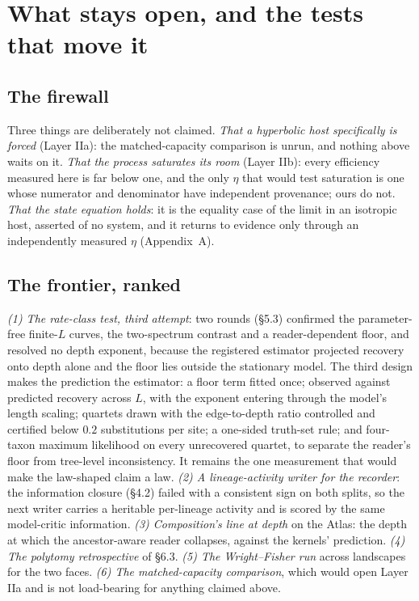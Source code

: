 \documentclass[11pt]{article}
\begin{document}
\section{What stays open, and the tests that move it}

\subsection{The firewall}
Three things are deliberately not claimed. \emph{That a hyperbolic host specifically is forced} (Layer IIa): the matched-capacity comparison is unrun, and nothing above waits on it. \emph{That the process saturates its room} (Layer IIb): every efficiency measured here is far below one, and the only $\eta$ that would test saturation is one whose numerator and denominator have independent provenance; ours do not. \emph{That the state equation holds}: it is the equality case of the limit in an isotropic host, asserted of no system, and it returns to evidence only through an independently measured $\eta$ (Appendix~A).

\subsection{The frontier, ranked}
\emph{(1) The rate-class test, third attempt}: two rounds (\S5.3) confirmed the parameter-free finite-$L$ curves, the two-spectrum contrast and a reader-dependent floor, and resolved no depth exponent, because the registered estimator projected recovery onto depth alone and the floor lies outside the stationary model. The third design makes the prediction the estimator: a floor term fitted once; observed against predicted recovery across $L$, with the exponent entering through the model's length scaling; quartets drawn with the edge-to-depth ratio controlled and certified below $0.2$ substitutions per site; a one-sided truth-set rule; and four-taxon maximum likelihood on every unrecovered quartet, to separate the reader's floor from tree-level inconsistency. It remains the one measurement that would make the law-shaped claim a law. \emph{(2) A lineage-activity writer for the recorder}: the information closure (\S4.2) failed with a consistent sign on both splits, so the next writer carries a heritable per-lineage activity and is scored by the same model-critic information. \emph{(3) Composition's line at depth} on the Atlas: the depth at which the ancestor-aware reader collapses, against the kernels' prediction. \emph{(4) The polytomy retrospective} of \S6.3. \emph{(5) The Wright--Fisher run} across landscapes for the two faces. \emph{(6) The matched-capacity comparison}, which would open Layer IIa and is not load-bearing for anything claimed above.
\end{document}
